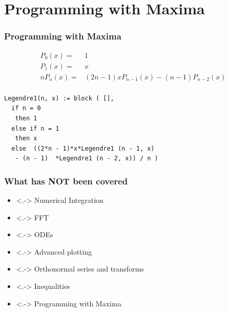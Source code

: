 \documentclass[12pt,usenames,pdftex]{beamer}
\begin{document}
\section{Programming with Maxima}

\begin{frame}[fragile]
  \frametitle{Programming with Maxima}
  \begin{eqnarray*}
    P_0(x) =& 1\\
    P_1(x) =& x\\
    nP_n(x) =& (2n-1)xP_{n-1}(x) - (n-1)P_{n-2}(x)\\
  \end{eqnarray*}  
\begin{verbatim}
Legendre1(n, x) := block ( [],
  if n = 0 
   then 1
  else if n = 1
   then x
  else  ((2*n - 1)*x*Legendre1 (n - 1, x)
   - (n - 1)  *Legendre1 (n - 2, x)) / n )
\end{verbatim}
\end{frame}

\begin{frame}[fragile]
  \frametitle{What has NOT been covered}
  \begin{itemize}
  \item<.-> Numerical Integration
  \item<.-> FFT
  \item<.-> ODEs
  \item<.-> Advanced plotting
  \item<.-> Orthonormal series and transforms
  \item<.-> Inequalities
  \item<.-> Programming with Maxima 
  \end{itemize}
\end{frame}
\end{document}
